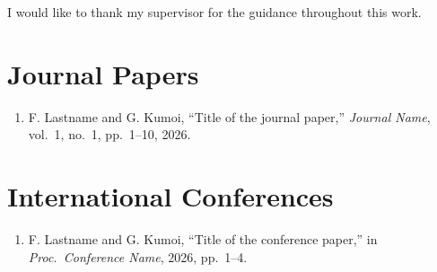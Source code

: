 \documentclass[en,doctor]{tmlthesis}
\begin{document}
\frontmatter
\maketitle

\begin{abstract}
This dissertation studies multiclass classification based on
error-correcting output codes (ECOC). We analyze the classification error of
ECOC classifiers and show conditions under which the code-word table attains
the optimal error rate. Experiments on text classification support the
analysis.
\end{abstract}

\tableofcontents
\listoffigures
\listoftables

\mainmatter




\backmatter
\begin{acknowledgements}
I would like to thank my supervisor for the guidance throughout this work.
\end{acknowledgements}




\begin{publications}
\section*{Journal Papers}
\begin{enumerate}
  \item F. Lastname and G. Kumoi, ``Title of the journal paper,''
        \textit{Journal Name}, vol.~1, no.~1, pp.~1--10, 2026.
\end{enumerate}
\section*{International Conferences}
\begin{enumerate}
  \item F. Lastname and G. Kumoi, ``Title of the conference paper,''
        in \textit{Proc.\ Conference Name}, 2026, pp.~1--4.
\end{enumerate}
\end{publications}
\end{document}
